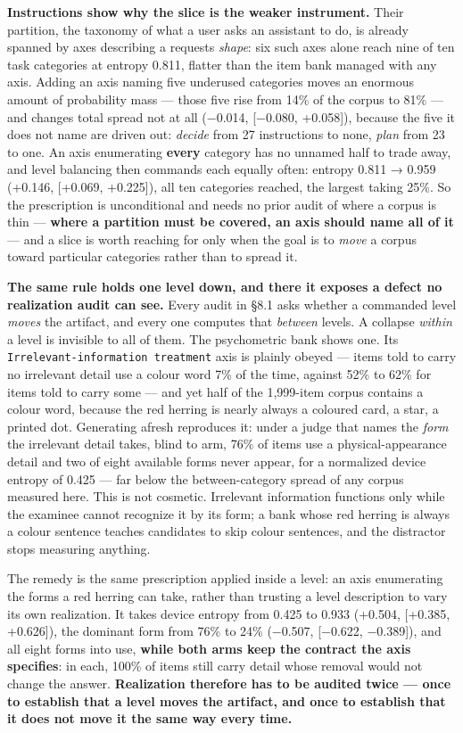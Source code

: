 \documentclass[
  10pt,
]{article}
\theoremstyle{plain}
\theoremstyle{definition}
\begin{document}
\textbf{Instructions show why the slice is the weaker instrument.} Their
partition, the taxonomy of what a user asks an assistant to do, is
already spanned by axes describing a request\textquotesingle s
\emph{shape}: six such axes alone reach nine of ten task categories at
entropy 0.811, flatter than the item bank managed with any axis. Adding
an axis naming five underused categories moves an enormous amount of
probability mass --- those five rise from 14\% of the corpus to 81\% ---
and changes total spread not at all (−0.014, {[}−0.080, +0.058{]}),
because the five it does not name are driven out: \emph{decide} from 27
instructions to none, \emph{plan} from 23 to one. An axis enumerating
\textbf{every} category has no unnamed half to trade away, and level
balancing then commands each equally often: entropy 0.811 → 0.959
(+0.146, {[}+0.069, +0.225{]}), all ten categories reached, the largest
taking 25\%. So the prescription is unconditional and needs no prior
audit of where a corpus is thin --- \textbf{where a partition must be
covered, an axis should name all of it} --- and a slice is worth
reaching for only when the goal is to \emph{move} a corpus toward
particular categories rather than to spread it.

\textbf{The same rule holds one level down, and there it exposes a
defect no realization audit can see.} Every audit in §8.1 asks whether a
commanded level \emph{moves} the artifact, and every one computes that
\emph{between} levels. A collapse \emph{within} a level is invisible to
all of them. The psychometric bank shows one. Its
\texttt{Irrelevant-information\ treatment} axis is plainly obeyed ---
items told to carry no irrelevant detail use a colour word 7\% of the
time, against 52\% to 62\% for items told to carry some --- and yet half
of the 1,999-item corpus contains a colour word, because the red herring
is nearly always a coloured card, a star, a printed dot. Generating
afresh reproduces it: under a judge that names the \emph{form} the
irrelevant detail takes, blind to arm, 76\% of items use a
physical-appearance detail and two of eight available forms never
appear, for a normalized device entropy of 0.425 --- far below the
between-category spread of any corpus measured here. This is not
cosmetic. Irrelevant information functions only while the examinee
cannot recognize it by its form; a bank whose red herring is always a
colour sentence teaches candidates to skip colour sentences, and the
distractor stops measuring anything.

The remedy is the same prescription applied inside a level: an axis
enumerating the forms a red herring can take, rather than trusting a
level description to vary its own realization. It takes device entropy
from 0.425 to 0.933 (+0.504, {[}+0.385, +0.626{]}), the dominant form
from 76\% to 24\% (−0.507, {[}−0.622, −0.389{]}), and all eight forms
into use, \textbf{while both arms keep the contract the axis specifies}:
in each, 100\% of items still carry detail whose removal would not
change the answer. \textbf{Realization therefore has to be audited twice
--- once to establish that a level moves the artifact, and once to
establish that it does not move it the same way every time.}
\end{document}

